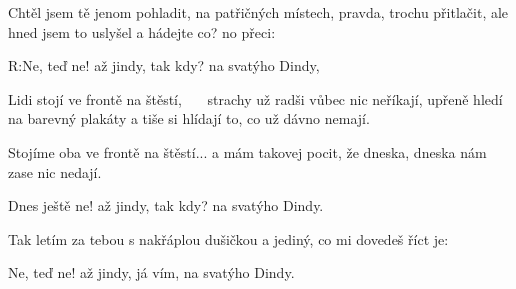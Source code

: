 \resetVars
{}
\MakeHeader
\Lyrics

Chtěl jsem tě jenom pohladit,
na patřičných místech, pravda, trochu přitlačit,
ale hned jsem to uslyšel
a hádejte co? no přeci:

R:Ne, teď ne! až jindy,
tak kdy? na svatýho Dindy,

Lidi stojí ve frontě na štěstí,~~~
strachy už radši vůbec nic neříkají,
upřeně hledí na barevný plakáty
a tiše si hlídají to, co už dávno nemají.

Stojíme oba ve frontě na štěstí... a mám takovej pocit,
že dneska, dneska nám zase nic nedají.

Dnes ještě ne! až jindy,
tak kdy? na svatýho Dindy.

Tak letím za tebou
s nakřáplou dušičkou
a jediný, co mi dovedeš říct je:

Ne, teď ne! až jindy,
já vím, na svatýho Dindy.

\Next
